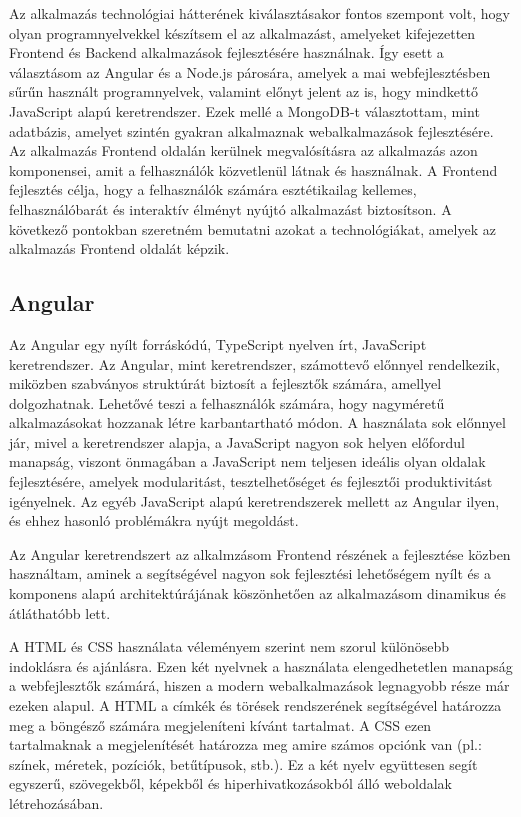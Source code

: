 Az alkalmazás technológiai hátterének kiválasztásakor fontos szempont volt, hogy olyan programnyelvekkel készítsem el az alkalmazást, amelyeket kifejezetten Frontend és Backend alkalmazások fejlesztésére használnak. Így esett a választásom az Angular és a Node.js párosára, amelyek a mai webfejlesztésben sűrűn használt programnyelvek, valamint előnyt jelent az is, hogy mindkettő JavaScript alapú keretrendszer. Ezek  mellé a MongoDB-t választottam, mint adatbázis, amelyet szintén gyakran alkalmaznak webalkalmazások fejlesztésére. 
Az alkalmazás Frontend oldalán kerülnek megvalósításra az alkalmazás azon komponensei, amit a felhasználók közvetlenül látnak és használnak. A Frontend fejlesztés célja, hogy a felhasználók számára esztétikailag kellemes, felhasználóbarát és interaktív élményt nyújtó alkalmazást biztosítson. A következő pontokban szeretném bemutatni azokat a technológiákat, amelyek az alkalmazás Frontend oldalát képzik.
\subsection{Angular}
Az Angular \cite{Angular1} egy nyílt forráskódú, TypeScript \cite{TypeScript} nyelven írt, JavaScript keretrendszer. Az Angular, mint keretrendszer, számottevő előnnyel rendelkezik, miközben szabványos struktúrát biztosít a fejlesztők számára, amellyel dolgozhatnak. Lehetővé teszi a felhasználók számára, hogy nagyméretű alkalmazásokat hozzanak létre karbantartható módon. A használata sok előnnyel jár, mivel a keretrendszer alapja, a JavaScript nagyon sok helyen előfordul manapság, viszont önmagában a JavaScript nem teljesen ideális olyan oldalak fejlesztésére, amelyek modularitást, tesztelhetőséget és fejlesztői produktivitást igényelnek. Az egyéb JavaScript alapú keretrendszerek mellett az Angular ilyen, és ehhez hasonló problémákra nyújt megoldást.

Az Angular keretrendszert az alkalmzásom Frontend részének a fejlesztése közben használtam, aminek a segítségével nagyon sok fejlesztési lehetőségem nyílt és a komponens alapú architektúrájának köszönhetően az alkalmazásom dinamikus és átláthatóbb lett.
\cite{Angular}

A HTML és CSS használata véleményem szerint nem szorul különösebb indoklásra és ajánlásra. Ezen két nyelvnek a használata elengedhetetlen manapság a webfejlesztők számárá, hiszen a modern webalkalmazások legnagyobb része már ezeken alapul. A HTML a címkék és törések rendszerének segítségével határozza meg a böngésző számára megjeleníteni kívánt tartalmat. A CSS ezen tartalmaknak a megjelenítését határozza meg amire számos opciónk van (pl.: színek, méretek, pozíciók, betűtípusok, stb.). Ez a két nyelv együttesen segít egyszerű, szövegekből, képekből és hiperhivatkozásokból álló weboldalak létrehozásában.
\cite{HTML}

